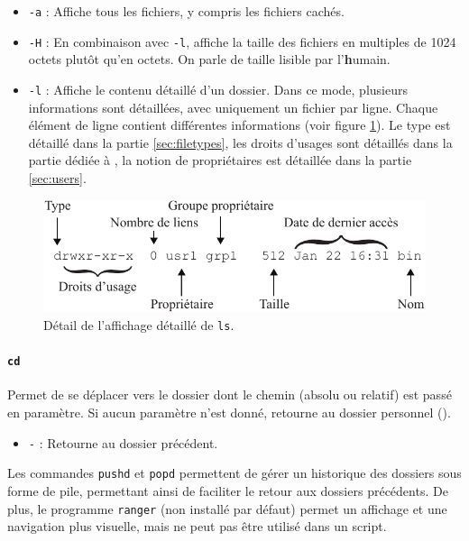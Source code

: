 \begin{itemize}
    \item \texttt{-a} : Affiche tous les fichiers, y compris les fichiers cachés. 
    \item \texttt{-H} : En combinaison avec \texttt{-l}, affiche la taille des fichiers en multiples de 1024 octets plutôt qu'en octets. On parle de taille lisible par l'\textbf{h}umain.
    \item \texttt{-l} : Affiche le contenu détaillé d'un dossier.
    Dans ce mode, plusieurs informations sont détaillées, avec uniquement un fichier par ligne. Chaque élément de ligne contient différentes informations (voir figure \ref{fig:lsl}). Le type est détaillé dans la partie \ref{sec:filetypes}, les droits d'usages sont détaillés dans la partie dédiée à , la notion de propriétaires est détaillée dans la partie \ref{sec:users}.
\end{itemize}

\begin{figure}[h!]
        \includegraphics{res/lsl.pdf}
        \centering
        \caption{Détail de l'affichage détaillé de \texttt{ls}.}
    \label{fig:lsl}
\end{figure}

\paragraph{\texttt{cd}} 
Permet de se déplacer vers le dossier dont le chemin (absolu ou relatif) est passé en paramètre. Si aucun paramètre n'est donné, retourne au dossier personnel (\texttt{\tilde}).
\begin{itemize}
    \item \texttt{-} : Retourne au dossier précédent.
\end{itemize}

 Les commandes \texttt{pushd} et \texttt{popd} permettent de gérer un historique des dossiers sous forme de pile, permettant ainsi de faciliter le retour aux dossiers précédents. \newline 
De plus, le programme \texttt{ranger} (non installé par défaut) permet un affichage et une navigation plus visuelle, mais ne peut pas être utilisé dans un script.

